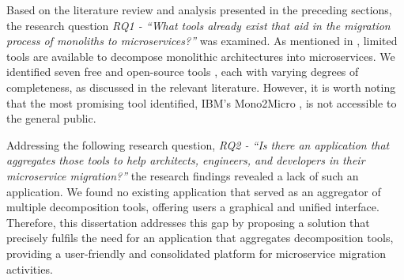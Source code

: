 Based on the literature review and analysis presented in the preceding
sections, the research question \textit{RQ1 - ``What tools already exist that
aid in the migration process of monoliths to microservices?''} was examined. As
mentioned in , limited tools are
available to decompose monolithic architectures into microservices. We
identified seven free and open-source tools , each with
varying degrees of completeness, as discussed in the relevant literature.
However, it is worth noting that the most promising tool identified, IBM's
Mono2Micro , is not accessible to the general public.

Addressing the following research question, \textit{RQ2 - ``Is there an
  application that aggregates those tools to help architects, engineers, and
developers in their microservice migration?''} the research findings revealed a
lack of such an application. We found no existing application that served as an
aggregator of multiple decomposition tools, offering users a graphical and
unified interface. Therefore, this dissertation addresses this gap by proposing
a solution that precisely fulfils the need for an application that aggregates
decomposition tools, providing a user-friendly and consolidated platform for
microservice migration activities.
